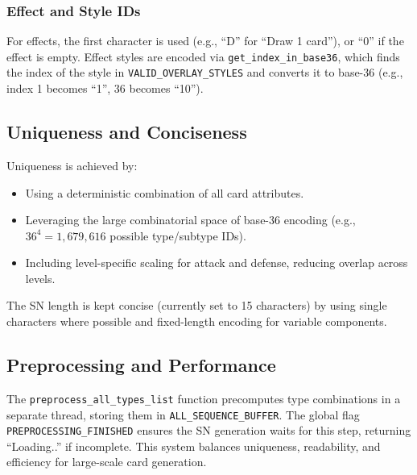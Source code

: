 \subsubsection{Effect and Style IDs}
For effects, the first character is used (e.g., ``D'' for ``Draw 1 card''), or ``0'' if the effect is empty. Effect styles are encoded via \texttt{get\_index\_in\_base36}, which finds the index of the style in \texttt{VALID\_OVERLAY\_STYLES} and converts it to base-36 (e.g., index 1 becomes ``1'', 36 becomes ``10'').

\subsection{Uniqueness and Conciseness}
Uniqueness is achieved by:
\begin{itemize}
	\item Using a deterministic combination of all card attributes.
	\item Leveraging the large combinatorial space of base-36 encoding (e.g., $36^4 = 1,679,616$ possible type/subtype IDs).
	\item Including level-specific scaling for attack and defense, reducing overlap across levels.
\end{itemize}
The SN length is kept concise (currently set to 15 characters) by using single characters where possible and fixed-length encoding for variable components.

\subsection{Preprocessing and Performance}
The \texttt{preprocess\_all\_types\_list} function precomputes type combinations in a separate thread, storing them in \texttt{ALL\_SEQUENCE\_BUFFER}. The global flag \texttt{PREPROCESSING\_FINISHED} ensures the SN generation waits for this step, returning ``Loading..'' if incomplete. This system balances uniqueness, readability, and efficiency for large-scale card generation.





